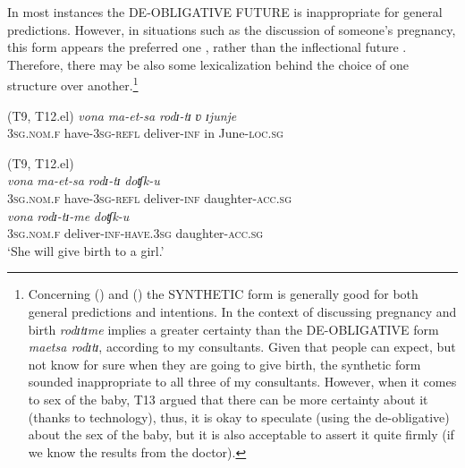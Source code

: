 \documentclass[output=paper,colorlinks,citecolor=brown]{langscibook}
\begin{document}
In most instances the \MakeUppercase{de-obligative future} is inappropriate for general predictions. However, in situations such as the discussion of someone’s pregnancy, this form appears the preferred one , rather than the inflectional future . Therefore, there may be also some lexicalization behind the choice of one structure over another.\footnote{Concerning () and () the \MakeUppercase{synthetic} form is generally good for both general predictions and intentions. In the context of discussing pregnancy and birth \textit{rodɪtɪme} implies a greater certainty than the \MakeUppercase{de-obligative} form \textit{maetsa rodɪtɪ}, according to my consultants. Given that people can expect, but not know for sure when they are going to give birth, the synthetic form sounded inappropriate to all three of my consultants. However, when it comes to sex of the baby, T13 argued that there can be more certainty about it (thanks to technology), thus, it is okay to speculate (using the de-obligative) about the sex of the baby, but it is also acceptable to assert it quite firmly (if we know the results from the doctor).}


\ea (T9, T12.el) \label{ex:roncero:9}
    \ea \label{ex:roncero:9a}
    \gll \textit{vona} \textit{ma-et-sa} \textit{rodɪ-tɪ} \textit{ʋ} \textit{ɪjunje} \\
    3\textsc{sg.nom.f} have-\textsc{3sg-refl} deliver-\textsc{inf} in June-\textsc{loc.sg}\\

     \label{ex:roncero:9b}
    \z
\z

\ea \label{ex:roncero:10}
    (T9, T12.el)\\
    \ea \label{ex:roncero:10a}
    \gll \textit{vona} \textit{ma-et-sa} \textit{rodɪ-tɪ} \textit{doʧk-u}\\
    3\textsc{sg.nom.f} have-\textsc{3sg-refl} deliver-\textsc{inf} daughter-\textsc{acc.sg}\\

    
    \ex \label{ex:roncero:10b}
    \gll \textit{vona} \textit{rodɪ-tɪ-me} \textit{doʧk-u}\\
    3\textsc{sg.nom.f} deliver-\textsc{inf-have.3sg} daughter-\textsc{acc.sg}\\
    \glt ‘She will give birth to a girl.’
\z
\z
\end{document}
